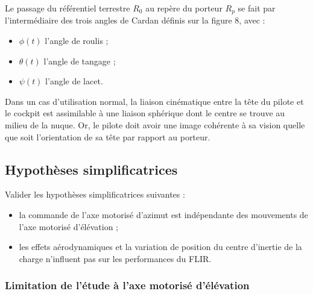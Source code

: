 Le passage du référentiel terrestre $R_0$ au repère du porteur $R_p$ se fait par l'intermédiaire des trois angles de
Cardan définis sur la figure 8, avec :
\begin{itemize}
\item $\phi(t)$ l'angle de roulis ;
\item $\theta(t)$ l'angle de tangage ;
\item $\psi(t)$ l'angle de lacet.
\end{itemize}


Dans un cas d'utilisation normal, la liaison cinématique entre la tête du pilote et le cockpit est assimilable à une
liaison sphérique dont le centre se trouve au milieu de la nuque. Or, le pilote doit avoir une image cohérente à
sa vision quelle que soit l'orientation de sa tête par rapport au porteur.


\subsection{Hypothèses simplificatrices}

\begin{objectif}
Valider les hypothèses simplificatrices suivantes :
\begin{itemize}
\item la commande de l'axe motorisé d'azimut est indépendante des mouvements de l'axe motorisé
d'élévation ;
\item  les effets aérodynamiques et la variation de position du centre d'inertie de la charge n'influent pas
sur les performances du FLIR.
\end{itemize}

\end{objectif}

\subsubsection{Limitation de l'étude à l'axe motorisé d'élévation}


